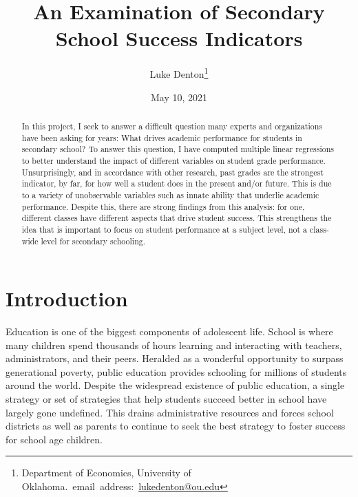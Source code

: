 \documentclass[12pt,english]{article}
\begin{document}
\renewcommand{\arraystretch}{0.7}
\setlength\LTleft{0pt}
\setlength\LTright{0pt}

\begin{singlespace}
\title{An Examination of Secondary School Success Indicators}
\end{singlespace}

\author{Luke Denton\thanks{Department of Economics, University of Oklahoma.\
email~address:~\href{mailto:lukedenton@ou.edu}{lukedenton@ou.edu}}}

\date{May 10, 2021}

\maketitle

\begin{abstract}
\begin{singlespace}
In this project, I seek to answer a difficult question many experts and organizations have been asking for years: What drives academic performance for students in secondary school? To answer this question, I have computed multiple linear regressions to better understand the impact of different variables on student grade performance. Unsurprisingly, and in accordance with other research, past grades are the strongest indicator, by far, for how well a student does in the present and/or future. This is due to a variety of unobservable variables such as innate ability that underlie academic performance. Despite this, there are strong findings from this analysis: for one, different classes have different aspects that drive student success. This strengthens the idea that is important to focus on student performance at a subject level, not a class-wide level for secondary schooling. 
\end{singlespace}

\end{abstract}
\vfill{}


\pagebreak{}


\section{Introduction}\label{sec:intro}
Education is one of the biggest components of adolescent life. School is where many children spend thousands of hours learning and interacting with teachers, administrators, and their peers. Heralded as a wonderful opportunity to surpass generational poverty, public education provides schooling for millions of students around the world. Despite the widespread existence of public education, a single strategy or set of strategies that help students succeed better in school have largely gone undefined. This drains administrative resources and forces school districts as well as parents to continue to seek the best strategy to foster success for school age children. 
\end{document}
